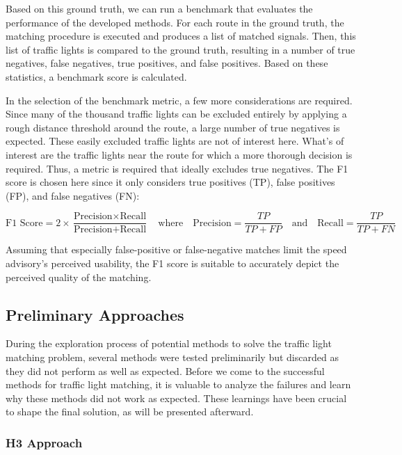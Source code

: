 Based on this ground truth, we can run a benchmark that evaluates the performance of the developed methods. For each route in the ground truth, the matching procedure is executed and produces a list of matched signals. Then, this list of traffic lights is compared to the ground truth, resulting in a number of true negatives, false negatives, true positives, and false positives. Based on these statistics, a benchmark score is calculated.

In the selection of the benchmark metric, a few more considerations are required. Since many of the thousand traffic lights can be excluded entirely by applying a rough distance threshold around the route, a large number of true negatives is expected. These easily excluded traffic lights are not of interest here. What's of interest are the traffic lights near the route for which a more thorough decision is required. Thus, a metric is required that ideally excludes true negatives. The F1 score is chosen here since it only considers true positives (TP), false positives (FP), and false negatives (FN): 

\begin{equation}
\text{F1 Score} = 2 \times \frac{\text{Precision} \times \text{Recall}}{\text{Precision} + \text{Recall}} \quad \text{where} \quad \text{Precision} = \frac{TP}{TP + FP} \quad \text{and} \quad \text{Recall} = \frac{TP}{TP + FN}
\end{equation}

Assuming that especially false-positive or false-negative matches limit the speed advisory's perceived usability, the F1 score is suitable to accurately depict the perceived quality of the matching.

\subsection{Preliminary Approaches}

During the exploration process of potential methods to solve the traffic light matching problem, several methods were tested preliminarily but discarded as they did not perform as well as expected. Before we come to the successful methods for traffic light matching, it is valuable to analyze the failures and learn why these methods did not work as expected. These learnings have been crucial to shape the final solution, as will be presented afterward.

\subsubsection{H3 Approach}

